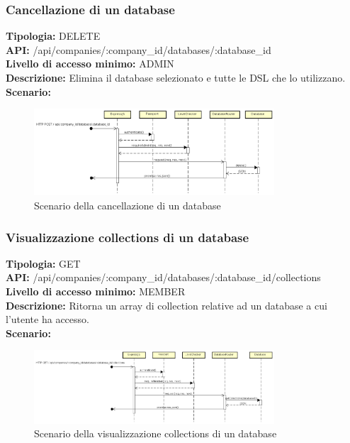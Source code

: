 \newpage
\subsubsection{Cancellazione di un database}
\textbf{Tipologia:} DELETE \\
\textbf{API:} /api/companies/:company\_id/databases/:database\_id \\
\textbf{Livello di accesso minimo:} ADMIN \\
\textbf{Descrizione:} Elimina il database selezionato e tutte le DSL che lo utilizzano. \\
\textbf{Scenario:} 
\begin{figure}[h]
\centering
\includegraphics[width=0.8\textwidth]{res/sections/backend/(DELETE)database.png}
\caption{Scenario della cancellazione di un database}
\end{figure}

\newpage
\subsubsection{Visualizzazione collections di un database}
\textbf{Tipologia:} GET \\
\textbf{API:} /api/companies/:company\_id/databases/:database\_id/collections \\
\textbf{Livello di accesso minimo:} MEMBER \\
\textbf{Descrizione:} Ritorna un array di collection relative ad un database a cui l'utente ha accesso. \\
\textbf{Scenario:} 
\begin{figure}[h]
\centering
\includegraphics[width=0.8\textwidth]{res/sections/backend/(GET)collection.png}
\caption{Scenario della visualizzazione collections di un database}
\end{figure}

